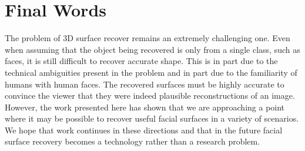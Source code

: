 \section{Final Words}
The problem of 3D surface recover remains an extremely challenging one. Even
when assuming that the object being recovered is only from a single class,
such as faces, it is still difficult to recover accurate shape. This is in
part due to the technical ambiguities present in the problem and in part
due to the familiarity of humans with human faces. The recovered surfaces must
be highly accurate to convince the viewer that they were indeed plausible
reconstructions of an image. However, the work presented here has shown that
we are approaching a point where it may be possible to recover useful facial
surfaces in a variety of scenarios. We hope that work continues in these
directions and that in the future facial surface recovery becomes a technology
rather than a research problem.
\stopcontents[chapters]
